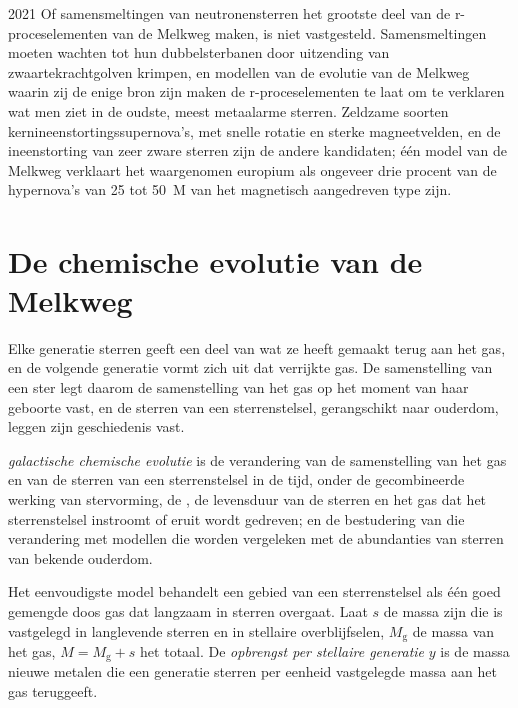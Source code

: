 \begin{dated}{2021}
Of samensmeltingen van neutronensterren het grootste deel van de r-proceselementen van de Melkweg maken,
is niet vastgesteld. Samensmeltingen moeten wachten tot hun dubbelsterbanen door uitzending van
zwaartekrachtgolven krimpen, en modellen van de evolutie van de Melkweg waarin zij de enige bron zijn
maken de r-proceselementen te laat om te verklaren wat men ziet in de
oudste, meest metaalarme sterren. Zeldzame soorten kernineenstortingssupernova's,
met snelle rotatie en sterke magneetvelden, en de ineenstorting van zeer zware sterren
zijn de andere kandidaten; één model van de Melkweg verklaart het waargenomen europium
als ongeveer drie procent van de hypernova's van \num{25} tot
\qty{50}{M_\odot} van het magnetisch
aangedreven type zijn.
\end{dated}

\section{De chemische evolutie van de Melkweg}\label{sec:b3:origin-of-elements:gce}

Elke generatie sterren geeft een deel van wat ze heeft gemaakt terug aan het gas, en
de volgende generatie vormt zich uit dat verrijkte gas. De samenstelling van een
ster legt daarom de samenstelling van het gas op het moment van haar geboorte vast, en de
sterren van een sterrenstelsel, gerangschikt naar ouderdom, leggen zijn geschiedenis vast.

\begin{definition}\label{def:b3:origin-of-elements:gce}
\emph{galactische chemische evolutie}
is de verandering van de samenstelling van het gas en van de sterren van een
sterrenstelsel in de tijd, onder de gecombineerde werking van stervorming, de , de levensduur van de sterren en het gas dat het sterrenstelsel instroomt of
eruit wordt gedreven; en de bestudering van die verandering met modellen die worden vergeleken
met de abundanties van sterren van bekende ouderdom.
\end{definition}

Het eenvoudigste model behandelt een gebied van een sterrenstelsel als één goed gemengde doos
gas dat langzaam in sterren overgaat. Laat $s$ de massa zijn die
is vastgelegd in langlevende sterren en in stellaire overblijfselen, $M_\mathrm{g}$ de massa van
het gas, $M = M_\mathrm{g} + s$ het totaal. De \emph{opbrengst per stellaire
generatie} $y$ is de massa nieuwe metalen die een generatie sterren
per eenheid vastgelegde massa aan het gas teruggeeft.

